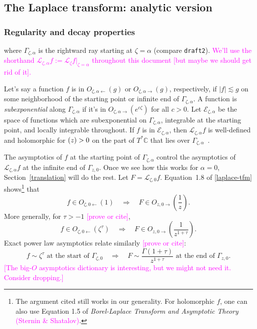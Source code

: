 \documentclass{article}
\let\Re\relax
\DeclareMathOperator{\Re}{Re}
\theoremstyle{definition}
\newcommand{\maps}{\colon}
\newcommand{\C}{\mathbb{C}}
\newcommand{\laplace}{\mathcal{L}}
\begin{document}
\subsection{The Laplace transform: analytic version}
\subsubsection{Regularity and decay properties}\label{reg-decay}
where $\Gamma_{\zeta, \alpha}$ is the rightward ray starting at $\zeta = \alpha$ (compare {\tt draft2}). \textcolor{magenta}{We'll use the shorthand $\laplace_{\zeta, \alpha} f := \laplace_\zeta f \big|_{\zeta = \alpha}$ throughout this document [but maybe we should get rid of it].}

Let's say a function $f$ is in $O_{\zeta, \alpha \leftarrow}(g)$ or $O_{\zeta, \alpha \rightarrow}(g)$, respectively, if $|f| \lesssim g$ on some neighborhood of the starting point or infinite end of $\Gamma_{\zeta, \alpha}$. A function is {\em subexponential} along $\Gamma_{\zeta, \alpha}$ if it's in $O_{\zeta, \alpha \rightarrow}(e^{c\zeta})$ for all $c > 0$. Let $\mathcal{E}_{\zeta, \alpha}$ be the space of functions which are subexponential on $\Gamma_{\zeta, \alpha}$, integrable at the starting point, and locally integrable throughout. If $f$ is in $\mathcal{E}_{\zeta, \alpha}$, then $\laplace_{\zeta, \alpha} f$ is well-defined and holomorphic for $\Re(z) > 0$ on the part of $T^*\C$ that lies over $\Gamma_{\zeta, \alpha}$~\cite[\S 5.6]{diverg-resurg-i}.

The asymptotics of $f$ at the starting point of $\Gamma_{\zeta, \alpha}$ control the asymptotics of $\laplace_{\zeta, \alpha} f$ at the infinite end of $\Gamma_{z, 0}$. Once we see how this works for $\alpha = 0$, Section~\ref{translation} will do the rest. Let $F = \laplace_{\zeta, 0} f$. Equation~1.8 of \ref{laplace-tfm} shows\footnote{The argument cited still works in our generality. For holomorphic $f$, one can also use Equation 1.5 of {\em Borel-Laplace Transform and Asymptotic Theory} \textcolor{magenta}{(Sternin \& Shatalov)}.} that
\[ f \in O_{\zeta, 0 \leftarrow}(1) \quad\Longrightarrow\quad F \in O_{z, 0 \rightarrow}\left(\frac{1}{z}\right). \]
More generally, for $\tau > -1$ \textcolor{magenta}{[prove or cite]},
\[ f \in O_{\zeta, 0 \leftarrow}(\zeta^\tau) \quad\Longrightarrow\quad F \in O_{z, 0 \rightarrow}\left(\frac{1}{z^{1 + \tau}}\right). \]
Exact power law asymptotics relate similarly \textcolor{magenta}{[prove or cite]}:
\[ f \sim \zeta^\tau \text{ at the start of } \Gamma_{\zeta, 0} \quad\Longrightarrow\quad F \sim \frac{\Gamma(1+\tau)}{z^{1+\tau}} \text{ at the end of } \Gamma_{z, 0}. \]
\textcolor{magenta}{[The big-$O$ asymptotics dictionary is interesting, but we might not need it. Consider dropping.]}
\end{document}
